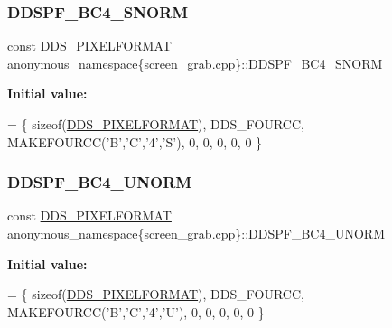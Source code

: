 \subsubsection{\texorpdfstring{D\+D\+S\+P\+F\+\_\+\+B\+C4\+\_\+\+S\+N\+O\+RM}{DDSPF\_BC4\_SNORM}}
{\footnotesize\ttfamily const \mbox{\hyperlink{structanonymous__namespace_02screen__grab_8cpp_03_1_1_d_d_s___p_i_x_e_l_f_o_r_m_a_t}{D\+D\+S\+\_\+\+P\+I\+X\+E\+L\+F\+O\+R\+M\+AT}} anonymous\+\_\+namespace\{screen\+\_\+grab.\+cpp\}\+::D\+D\+S\+P\+F\+\_\+\+B\+C4\+\_\+\+S\+N\+O\+RM}

{\bfseries Initial value\+:}
\begin{DoxyCode}
=
        \{ \textcolor{keyword}{sizeof}(\mbox{\hyperlink{struct_d_d_s___p_i_x_e_l_f_o_r_m_a_t}{DDS\_PIXELFORMAT}}), DDS\_FOURCC, MAKEFOURCC(\textcolor{charliteral}{'B'},\textcolor{charliteral}{'C'},\textcolor{charliteral}{'4'},\textcolor{charliteral}{'S'}), 0, 0, 0, 0, 0 \}
\end{DoxyCode}
\mbox{\label{namespaceanonymous__namespace_02screen__grab_8cpp_03_aa9a1896ce90ebd69041a9afe88bb5435}} 
\subsubsection{\texorpdfstring{D\+D\+S\+P\+F\+\_\+\+B\+C4\+\_\+\+U\+N\+O\+RM}{DDSPF\_BC4\_UNORM}}
{\footnotesize\ttfamily const \mbox{\hyperlink{structanonymous__namespace_02screen__grab_8cpp_03_1_1_d_d_s___p_i_x_e_l_f_o_r_m_a_t}{D\+D\+S\+\_\+\+P\+I\+X\+E\+L\+F\+O\+R\+M\+AT}} anonymous\+\_\+namespace\{screen\+\_\+grab.\+cpp\}\+::D\+D\+S\+P\+F\+\_\+\+B\+C4\+\_\+\+U\+N\+O\+RM}

{\bfseries Initial value\+:}
\begin{DoxyCode}
=
        \{ \textcolor{keyword}{sizeof}(\mbox{\hyperlink{struct_d_d_s___p_i_x_e_l_f_o_r_m_a_t}{DDS\_PIXELFORMAT}}), DDS\_FOURCC, MAKEFOURCC(\textcolor{charliteral}{'B'},\textcolor{charliteral}{'C'},\textcolor{charliteral}{'4'},\textcolor{charliteral}{'U'}), 0, 0, 0, 0, 0 \}
\end{DoxyCode}
\mbox{\label{namespaceanonymous__namespace_02screen__grab_8cpp_03_a4c0fe1d61542bbe71717cdb509cf5d97}} 
